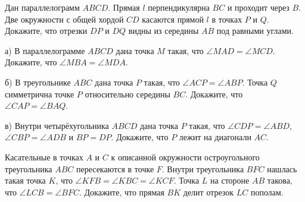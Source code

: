 Дан параллелограмм $A B C D$. Прямая $l$ перпендикулярна $B C$ и проходит через $B$. Две окружности с общей хордой $C D$ касаются прямой $l$ в точках $P$ и $Q$. Докажите, что отрезки $D P$ и $D Q$ видны из середины $A B$ под равными углами.

а) В параллелограмме $A B C D$ дана точка $M$ такая, что $\angle M A D=\angle M C D$. Докажите, что $\angle M B A=\angle M D A$.

\noindent
б) В треугольнике $A B C$ дана точка $P$ такая, что $\angle A C P=\angle A B P$. Точка $Q$ симметрична точке $P$ относительно середины $B C$. Докажите, что $\angle C A P=\angle B A Q$.

\noindent
в) Внутри четырёхугольника $A B C D$ дана точка $P$ такая, что $\angle C D P=\angle A B D$, $\angle C B P=\angle A D B$ и $B P=D P$. Докажите, что $P$ лежит на диагонали $A C$.

Касательные в точках $A$ и $C$ к описанной окружности остроугольного треугольника $A B C$ пересекаются в точке $F$. Внутри треугольника $B F C$ нашлась такая точка $K$, что $\angle K F B=\angle K B C=\angle K C F$. Точка $L$ на стороне $A B$ такова, что $\angle L C B=\angle B F C$. Докажите, что прямая $B K$ делит отрезок $L C$ пополам.
